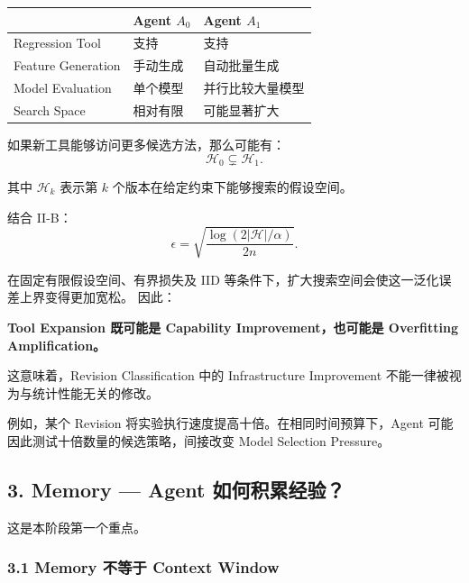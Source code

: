 \begin{readertable}
\begin{longtable}[]{@{}
  >{\raggedright\arraybackslash}p{}
  >{\raggedright\arraybackslash}p{}
  >{\raggedright\arraybackslash}p{}@{}}
\toprule
& Agent \(A_0\) & Agent \(A_1\) \\
\midrule
\endhead
Regression Tool & 支持 & 支持 \\
Feature Generation & 手动生成 & 自动批量生成 \\
Model Evaluation & 单个模型 & 并行比较大量模型 \\
Search Space & 相对有限 & 可能显著扩大 \\
\bottomrule
\end{longtable}
\end{readertable}

如果新工具能够访问更多候选方法，那么可能有：
\[\mathcal H_0\subsetneq\mathcal H_1.\]

其中 \(\mathcal H_k\) 表示第 \(k\) 个版本在给定约束下能够搜索的假设空间。

结合 II-B：
\[\epsilon=
\sqrt{\frac{\log(2|\mathcal H|/\alpha)}{2n}}.\]

在固定有限假设空间、有界损失及 IID 等条件下，扩大搜索空间会使这一泛化误差上界变得更加宽松。 因此：

\textbf{Tool Expansion 既可能是 Capability Improvement，也可能是 Overfitting Amplification。}

这意味着，Revision Classification 中的 Infrastructure Improvement 不能一律被视为与统计性能无关的修改。

例如，某个 Revision 将实验执行速度提高十倍。在相同时间预算下，Agent 可能因此测试十倍数量的候选策略，间接改变 Model Selection Pressure。

\hypertarget{part-3-34-0001-memory-agent-ux5982ux4f55ux79efux7d2fux7ecfux9a8c}{%
\subsection{3. Memory --- Agent 如何积累经验？}\label{part-3-34-0001-memory-agent-ux5982ux4f55ux79efux7d2fux7ecfux9a8c}}

这是本阶段第一个重点。

\hypertarget{part-3-34-0001-memory-ux4e0dux7b49ux4e8e-context-window}{%
\subsubsection{3.1 Memory 不等于 Context Window}\label{part-3-34-0001-memory-ux4e0dux7b49ux4e8e-context-window}}

